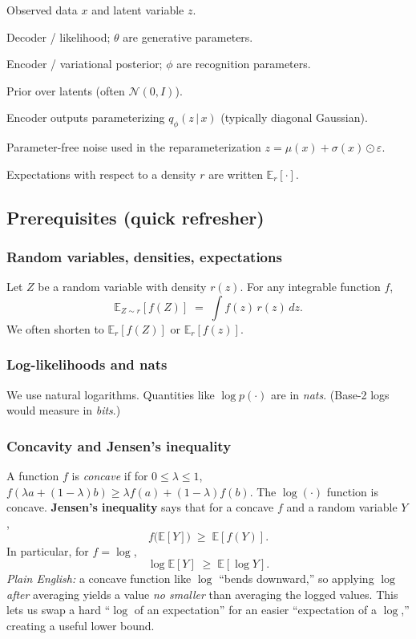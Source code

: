 \documentclass[11pt]{article}
\newcommand{\E}{\mathbb{E}}
\newcommand{\given}{\,\vert\,}
\theoremstyle{remark}
\begin{document}
\begin{description}[style=nextline,leftmargin=1.8em,labelsep=0.6em]
  \item[$x,z$] Observed data $x$ and latent variable $z$.
  \item[$p_\theta(x\given z)$] Decoder / likelihood; $\theta$ are generative parameters.
  \item[$q_\phi(z\given x)$] Encoder / variational posterior; $\phi$ are recognition parameters.
  \item[$p(z)$] Prior over latents (often $\mathcal N(0,I)$).
  \item[$\mu(x),\sigma(x)$] Encoder outputs parameterizing $q_\phi(z\given x)$ (typically diagonal Gaussian).
  \item[$\varepsilon\sim\mathcal N(0,I)$] Parameter-free noise used in the reparameterization $z=\mu(x)+\sigma(x)\odot\varepsilon$.
\end{description}
Expectations with respect to a density $r$ are written $\E_r[\cdot]$.

\subsection{Prerequisites (quick refresher)}
\subsubsection*{Random variables, densities, expectations}
Let $Z$ be a random variable with density $r(z)$. For any integrable function $f$,
\[
\E_{Z\sim r}[f(Z)] \;=\; \int f(z)\, r(z)\,dz.
\]
We often shorten to $\E_{r}[f(Z)]$ or $\E_r[f(z)]$.

\subsubsection*{Log-likelihoods and nats}
We use natural logarithms. Quantities like $\log p(\cdot)$ are in \emph{nats}. (Base-2 logs would measure in \emph{bits}.)

\subsubsection*{Concavity and Jensen's inequality}
A function $f$ is \emph{concave} if for $0\le \lambda \le 1$,
$f(\lambda a+(1-\lambda)b)\ge \lambda f(a)+(1-\lambda)f(b)$. The $\log(\cdot)$ function is concave. \textbf{Jensen's inequality} says that for a concave $f$ and a random variable $Y$,
\[
f\!\big(\E[Y]\big)\;\ge\;\E[f(Y)] .
\]
In particular, for $f=\log$,
\[
\log \E[Y] \;\ge\; \E[\log Y].
\]
\emph{Plain English:} a concave function like $\log$ ``bends downward,'' so applying $\log$ \emph{after} averaging yields a value \emph{no smaller} than averaging the logged values. This lets us swap a hard ``$\log$ of an expectation'' for an easier ``expectation of a $\log$,'' creating a useful lower bound.
\end{document}
